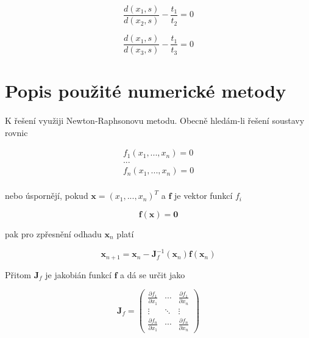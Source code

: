 \documentclass{article}
\begin{document}
    \begin{equation}
        \frac{d(x_1, s)}{d(x_2, s)} - \frac{t_1}{t_2} = 0
    \end{equation}

    \begin{equation}
        \frac{d(x_1, s)}{d(x_3, s)} - \frac{t_1}{t_3} = 0
    \end{equation}

    \section{Popis použité numerické metody}

    \paragraph{} K řešení využiji Newton-Raphsonovu metodu. Obecně hledám-li řešení soustavy
    rovnic

    \begin{equation}
        \begin{split}
        f_1(x_1, ..., x_n) = 0 \\
        ... \\
        f_n(x_1, ..., x_n) = 0 \\
        \end{split}
    \end{equation}

    nebo úspornějí, pokud $\mathbf{x} = (x_1, ..., x_n)^{T}$ a $\mathbf{f}$ je vektor
    funkcí $f_i$

    \begin{equation}
        \mathbf{f}(\mathbf{x}) = \mathbf{0}
    \end{equation}

    pak pro zpřesnění odhadu $\mathbf{x}_{n}$ platí

    \begin{equation}
        \mathbf{x}_{n + 1} = \mathbf{x}_{n} - \mathbf{J}_{f}^{-1}(\mathbf{x}_{n}) 
        \mathbf{f}(\mathbf{x}_{n})
    \end{equation}

    Přitom $\mathbf{J}_{f}$ je jakobián funkcí $\mathbf{f}$ a dá se určit jako

    \begin{equation}
        \mathbf{J}_{f} = 
            \begin{pmatrix}
                \frac{\partial f_1}{\partial x_1} & \cdots & \frac{\partial f_1}{\partial x_n} \\
                \vdots  & \ddots & \vdots  \\
                \frac{\partial f_n}{\partial x_1} & \cdots & \frac{\partial f_n}{\partial x_n} 
            \end{pmatrix}
    \end{equation}
\end{document}
